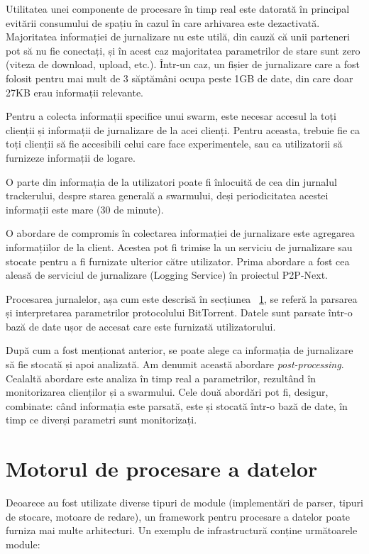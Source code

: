 Utilitatea unei componente de procesare în timp real este datorată în
principal evitării consumului de spațiu în cazul în care arhivarea este
dezactivată. Majoritatea informației de jurnalizare nu este utilă, din cauză
că unii parteneri pot să nu fie conectați, și în acest caz majoritatea
parametrilor de stare sunt zero (viteza de download, upload, etc.). Într-un caz,
un fișier de jurnalizare care a fost folosit pentru mai mult de 3 săptămâni
ocupa peste 1GB de date, din care doar 27KB erau informații relevante.

Pentru a colecta informații specifice unui swarm, este necesar accesul la
toți clienții și informații de jurnalizare de la acei clienți. Pentru aceasta,
trebuie fie ca toți clienții să fie accesibili celui care face experimentele,
sau ca utilizatorii să furnizeze informații de logare.

O parte din informația de la utilizatori poate fi înlocuită de cea din jurnalul
trackerului, despre starea generală a swarmului, deși periodicitatea acestei informații este mare (30 de minute).

O abordare de compromis în colectarea informației de jurnalizare este agregarea
informațiilor de la client. Acestea pot fi trimise la un serviciu de
jurnalizare sau stocate pentru a fi furnizate ulterior către utilizator.
Prima abordare a fost cea aleasă de serviciul de jurnalizare (Logging Service)
în proiectul P2P-Next.

Procesarea jurnalelor, așa cum este descrisă în secțiunea
~\ref{sec:proto-measure:data-processing}, se referă la parsarea și interpretarea
parametrilor protocolului BitTorrent. Datele sunt parsate într-o bază de date
ușor de accesat care este furnizată utilizatorului.

După cum a fost menționat anterior, se poate alege ca informația de jurnalizare
să fie stocată și apoi analizată. Am denumit această abordare 
\textit{post-processing}. Cealaltă abordare este analiza în timp real a
parametrilor, rezultând în monitorizarea clienților și a swarmului. Cele două
abordări pot fi, desigur, combinate: când informația este parsată, este
și stocată într-o bază de date, în timp ce diverși parametri sunt monitorizați.

\section{Motorul de procesare a datelor}
\label{sec:proto-measure:data-processing}

Deoarece au fost utilizate diverse tipuri de module (implementări de parser,
tipuri de stocare, motoare de redare), un framework pentru procesare a datelor
poate furniza mai multe arhitecturi. Un exemplu de infrastructură conține
următoarele module:

